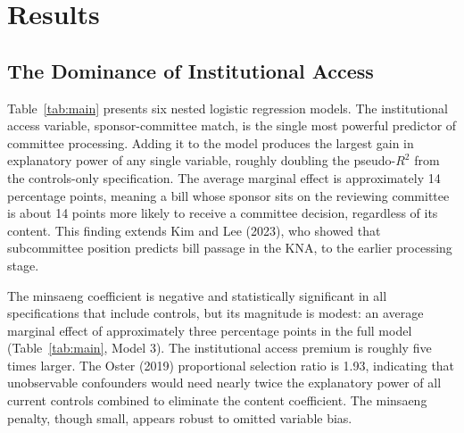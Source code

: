 \documentclass[11pt]{article}
\begin{document}
\section{Results}

\subsection{The Dominance of Institutional Access}

Table~\ref{tab:main} presents six nested logistic regression models. The institutional access variable, sponsor-committee match, is the single most powerful predictor of committee processing. Adding it to the model produces the largest gain in explanatory power of any single variable, roughly doubling the pseudo-$R^2$ from the controls-only specification. The average marginal effect is approximately 14 percentage points, meaning a bill whose sponsor sits on the reviewing committee is about 14 points more likely to receive a committee decision, regardless of its content. This finding extends Kim and Lee (2023), who showed that subcommittee position predicts bill passage in the KNA, to the earlier processing stage.

The minsaeng coefficient is negative and statistically significant in all specifications that include controls, but its magnitude is modest: an average marginal effect of approximately three percentage points in the full model (Table~\ref{tab:main}, Model 3). The institutional access premium is roughly five times larger. The Oster (2019) proportional selection ratio is 1.93, indicating that unobservable confounders would need nearly twice the explanatory power of all current controls combined to eliminate the content coefficient. The minsaeng penalty, though small, appears robust to omitted variable bias.
\end{document}
